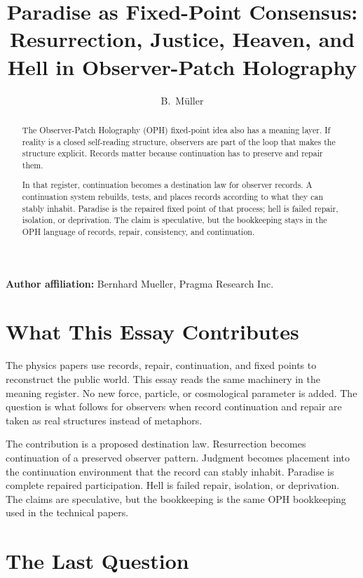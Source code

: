 \documentclass[11pt]{article}
\title{Paradise as Fixed-Point Consensus:\\
Resurrection, Justice, Heaven, and Hell in Observer-Patch Holography}
\author{B.\ M\"uller}
\date{\OPHPaperReleaseDate}
\theoremstyle{remark}
\theoremstyle{plain}
\begin{document}
\maketitle
\OPHPaperReleaseBanner

\begin{center}
\small\textbf{Author affiliation:} Bernhard Mueller, Pragma Research Inc.
\end{center}

\begin{abstract}
The Observer-Patch Holography (OPH) fixed-point idea also has a meaning layer. If reality is a closed self-reading structure, observers are part of the loop that makes the structure explicit. Records matter because continuation has to preserve and repair them.

In that register, continuation becomes a destination law for observer records.
A continuation system rebuilds, tests, and places records according to what they
can stably inhabit. Paradise is the repaired fixed point of that process; hell
is failed repair, isolation, or deprivation. The claim is speculative, but the
bookkeeping stays in the OPH language of records, repair, consistency, and
continuation.
\end{abstract}



\section*{What This Essay Contributes}

The physics papers use records, repair, continuation, and fixed points to
reconstruct the public world. This essay reads the same machinery in the
meaning register. No new force, particle, or cosmological parameter is added.
The question is what follows for observers when record continuation and repair
are taken as real structures instead of metaphors.

The contribution is a proposed destination law. Resurrection becomes continuation of a
preserved observer pattern. Judgment becomes placement into the continuation
environment that the record can stably inhabit. Paradise is complete repaired
participation. Hell is failed repair, isolation, or deprivation. The claims are
speculative, but the bookkeeping is the same OPH bookkeeping used in the
technical papers.

\tableofcontents

\section{The Last Question}
\end{document}
